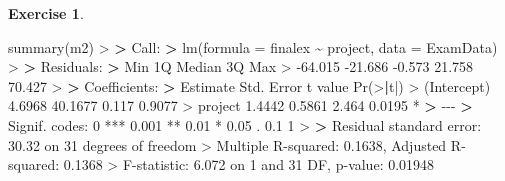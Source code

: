 \documentclass[
]{book}
\newenvironment{Shaded}{\begin{snugshade}}{\end{snugshade}}
\newcommand{\AttributeTok}[1]{\textcolor[rgb]{0.77,0.63,0.00}{#1}}
\newcommand{\DecValTok}[1]{\textcolor[rgb]{0.00,0.00,0.81}{#1}}
\newcommand{\ErrorTok}[1]{\textcolor[rgb]{0.64,0.00,0.00}{\textbf{#1}}}
\newcommand{\FloatTok}[1]{\textcolor[rgb]{0.00,0.00,0.81}{#1}}
\newcommand{\FunctionTok}[1]{\textcolor[rgb]{0.00,0.00,0.00}{#1}}
\newcommand{\NormalTok}[1]{#1}
\newcommand{\SpecialCharTok}[1]{\textcolor[rgb]{0.00,0.00,0.00}{#1}}
\newcommand{\StringTok}[1]{\textcolor[rgb]{0.31,0.60,0.02}{#1}}
\theoremstyle{definition}
\theoremstyle{definition}
\theoremstyle{definition}
\newtheorem{exercise}{Exercise}[chapter]
\theoremstyle{definition}
\theoremstyle{remark}
\begin{document}
\begin{exercise}
\begin{Shaded}
\begin{Highlighting}[]
\FunctionTok{summary}\NormalTok{(m2)}
\SpecialCharTok{\textgreater{}} 
\ErrorTok{\textgreater{}}\NormalTok{ Call}\SpecialCharTok{:}
\ErrorTok{\textgreater{}} \FunctionTok{lm}\NormalTok{(}\AttributeTok{formula =}\NormalTok{ finalex }\SpecialCharTok{\textasciitilde{}}\NormalTok{ project, }\AttributeTok{data =}\NormalTok{ ExamData)}
\SpecialCharTok{\textgreater{}} 
\ErrorTok{\textgreater{}}\NormalTok{ Residuals}\SpecialCharTok{:}
\ErrorTok{\textgreater{}}\NormalTok{     Min      1Q  Median      3Q     Max }
\SpecialCharTok{\textgreater{}} \SpecialCharTok{{-}}\FloatTok{64.015} \SpecialCharTok{{-}}\FloatTok{21.686}  \SpecialCharTok{{-}}\FloatTok{0.573}  \FloatTok{21.758}  \FloatTok{70.427} 
\SpecialCharTok{\textgreater{}} 
\ErrorTok{\textgreater{}}\NormalTok{ Coefficients}\SpecialCharTok{:}
\ErrorTok{\textgreater{}}\NormalTok{             Estimate Std. Error t value }\FunctionTok{Pr}\NormalTok{(}\SpecialCharTok{\textgreater{}}\ErrorTok{|}\NormalTok{t}\SpecialCharTok{|}\NormalTok{)  }
\SpecialCharTok{\textgreater{}}\NormalTok{ (Intercept)   }\FloatTok{4.6968}    \FloatTok{40.1677}   \FloatTok{0.117}   \FloatTok{0.9077}  
\SpecialCharTok{\textgreater{}}\NormalTok{ project       }\FloatTok{1.4442}     \FloatTok{0.5861}   \FloatTok{2.464}   \FloatTok{0.0195} \SpecialCharTok{*}
\ErrorTok{\textgreater{}} \SpecialCharTok{{-}{-}{-}}
\ErrorTok{\textgreater{}}\NormalTok{ Signif. codes}\SpecialCharTok{:}  \DecValTok{0} \StringTok{\textquotesingle{}***\textquotesingle{}} \FloatTok{0.001} \StringTok{\textquotesingle{}**\textquotesingle{}} \FloatTok{0.01} \StringTok{\textquotesingle{}*\textquotesingle{}} \FloatTok{0.05} \StringTok{\textquotesingle{}.\textquotesingle{}} \FloatTok{0.1} \StringTok{\textquotesingle{} \textquotesingle{}} \DecValTok{1}
\SpecialCharTok{\textgreater{}} 
\ErrorTok{\textgreater{}}\NormalTok{ Residual standard error}\SpecialCharTok{:} \FloatTok{30.32}\NormalTok{ on }\DecValTok{31}\NormalTok{ degrees of freedom}
\SpecialCharTok{\textgreater{}}\NormalTok{ Multiple R}\SpecialCharTok{{-}}\NormalTok{squared}\SpecialCharTok{:}  \FloatTok{0.1638}\NormalTok{,  Adjusted R}\SpecialCharTok{{-}}\NormalTok{squared}\SpecialCharTok{:}  \FloatTok{0.1368} 
\SpecialCharTok{\textgreater{}}\NormalTok{ F}\SpecialCharTok{{-}}\NormalTok{statistic}\SpecialCharTok{:} \FloatTok{6.072}\NormalTok{ on }\DecValTok{1}\NormalTok{ and }\DecValTok{31}\NormalTok{ DF,  p}\SpecialCharTok{{-}}\NormalTok{value}\SpecialCharTok{:} \FloatTok{0.01948}
\end{Highlighting}
\end{Shaded}


\end{exercise}
\end{document}
